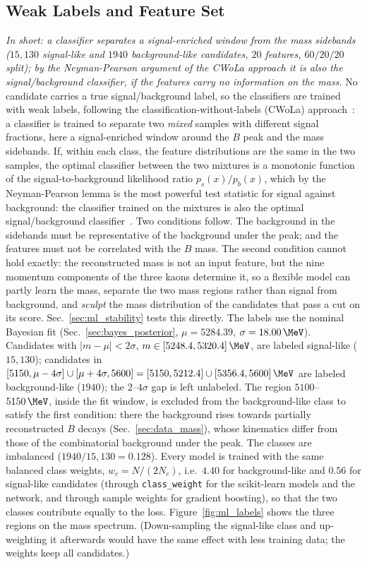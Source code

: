 \subsection{Weak Labels and Feature Set}
\label{sec:ml_labels}
\emph{In short: a classifier separates a signal-enriched window from the mass sidebands ($15{,}130$ signal-like and $1940$ background-like candidates, $20$ features, $60/20/20$ split); by the Neyman-Pearson argument of the CWoLa approach it is also the signal/background classifier, if the features carry no information on the mass.}
No candidate carries a true signal/background label, so the classifiers are trained with weak labels, following the classification-without-labels (CWoLa) approach~\cite{cwola}: a classifier is trained to separate two \emph{mixed} samples with different signal fractions, here a signal-enriched window around the $B$ peak and the mass sidebands. If, within each class, the feature distributions are the same in the two samples, the optimal classifier between the two mixtures is a monotonic function of the signal-to-background likelihood ratio $p_s(x)/p_b(x)$, which by the Neyman-Pearson lemma is the most powerful test statistic for signal against background: the classifier trained on the mixtures is also the optimal signal/background classifier~\cite{cwola}. Two conditions follow. The background in the sidebands must be representative of the background under the peak; and the features must not be correlated with the $B$ mass. The second condition cannot hold exactly: the reconstructed mass is not an input feature, but the nine momentum components of the three kaons determine it, so a flexible model can partly learn the mass, separate the two mass regions rather than signal from background, and \emph{sculpt} the mass distribution of the candidates that pass a cut on its score. Sec.~\ref{sec:ml_stability} tests this directly.
The labels use the nominal Bayesian fit (Sec.~\ref{sec:bayes_posterior}, $\mu=5284.39$, $\sigma=18.00\,\MeV$). Candidates with $|m-\mu|<2\sigma$, $m\in[5248.4,5320.4]\,\MeV$, are labeled signal-like ($15{,}130$); candidates in $[5150,\mu-4\sigma]\cup[\mu+4\sigma,5600]=[5150,5212.4]\cup[5356.4,5600]\,\MeV$ are labeled background-like ($1940$); the $2$--$4\sigma$ gap is left unlabeled. The region $5100$--$5150\,\MeV$, inside the fit window, is excluded from the background-like class to satisfy the first condition: there the background rises towards partially reconstructed $B$ decays (Sec.~\ref{sec:data_mass}), whose kinematics differ from those of the combinatorial background under the peak. The classes are imbalanced ($1940/15{,}130=0.128$). Every model is trained with the same balanced class weights, $w_c=N/(2N_c)$, i.e.\ $4.40$ for background-like and $0.56$ for signal-like candidates (through \texttt{class\_weight} for the scikit-learn models and the network, and through sample weights for gradient boosting), so that the two classes contribute equally to the loss. Figure~\ref{fig:ml_labels} shows the three regions on the mass spectrum. (Down-sampling the signal-like class and up-weighting it afterwards would have the same effect with less training data; the weights keep all candidates.)

